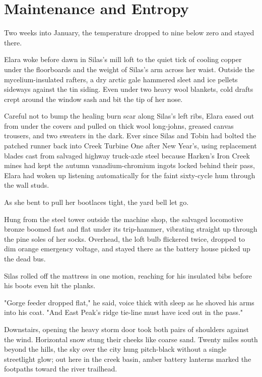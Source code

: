 \chapter{Maintenance and Entropy}

Two weeks into January, the temperature dropped to nine below zero and stayed there.

Elara woke before dawn in Silas's mill loft to the quiet tick of cooling copper under the floorboards and the weight of Silas's arm across her waist. Outside the mycelium-insulated rafters, a dry arctic gale hammered sleet and ice pellets sideways against the tin siding. Even under two heavy wool blankets, cold drafts crept around the window sash and bit the tip of her nose.

Careful not to bump the healing burn scar along Silas's left ribs, Elara eased out from under the covers and pulled on thick wool long-johns, greased canvas trousers, and two sweaters in the dark. Ever since Silas and Tobin had bolted the patched runner back into Creek Turbine One after New Year's, using replacement blades cast from salvaged highway truck-axle steel because Harken's Iron Creek mines had kept the autumn vanadium-chromium ingots locked behind their pass, Elara had woken up listening automatically for the faint sixty-cycle hum through the wall studs.

As she bent to pull her bootlaces tight, the yard bell let go.

Hung from the steel tower outside the machine shop, the salvaged locomotive bronze boomed fast and flat under its trip-hammer, vibrating straight up through the pine soles of her socks. Overhead, the loft bulb flickered twice, dropped to dim orange emergency voltage, and stayed there as the battery house picked up the dead bus.

Silas rolled off the mattress in one motion, reaching for his insulated bibs before his boots even hit the planks.

"Gorge feeder dropped flat," he said, voice thick with sleep as he shoved his arms into his coat. "And East Peak's ridge tie-line must have iced out in the pass."

Downstairs, opening the heavy storm door took both pairs of shoulders against the wind. Horizontal snow stung their cheeks like coarse sand. Twenty miles south beyond the hills, the sky over the city hung pitch-black without a single streetlight glow; out here in the creek basin, amber battery lanterns marked the footpaths toward the river trailhead.

